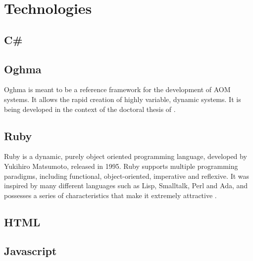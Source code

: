 \chapter{Technologies}\label{chap:technologies}

\section{C\#}\label{sec:csharp}

\section{Oghma}\label{sec:oghma}


Oghma is meant to be a reference framework for the development of AOM systems. It allows the rapid creation of highly variable, dynamic systems. It is being developed in the context of the doctoral thesis of \cite{hugo_ferreira}.

\section{Ruby}\label{sec:technologies:ruby}

Ruby is a dynamic, purely object oriented programming language, developed by Yukihiro Matsumoto, released in 1995. Ruby supports multiple programming paradigms, including functional, object-oriented, imperative and reflexive. It was inspired by many different languages such as Lisp, Smalltalk, Perl and Ada, and possesses a series of characteristics that make it extremely attractive \cite{ruby}.

\section{HTML}\label{sec:html}

\section{Javascript}\label{sec:javascript}


